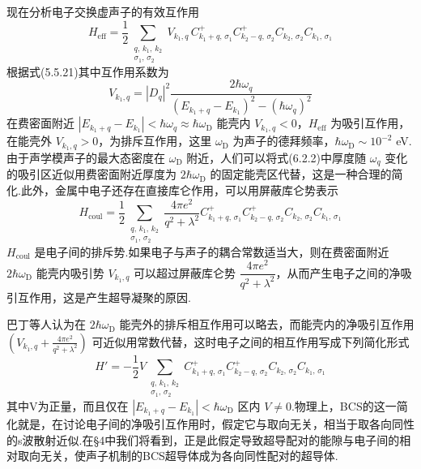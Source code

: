 现在分析电子交换虚声子的有效互作用
\begin{equation}
  H_{\mathrm{eff}}=\frac{1}{2}\sum_{\substack{q,\,k_{1},\,k_{2}\\\sigma_{1},\,\sigma_{2}}}
  V_{k_{1},q}\,C^{+}_{k_{1}+q,\,\sigma_{1}}C^{+}_{k_{2}-q,\,\sigma_{2}}
  C_{k_{2},\,\sigma_{2}}C_{k_{1},\,\sigma_{1}}
\end{equation}
根据式(5.5.21)其中互作用系数为
\begin{equation}
  V_{k_{1},q}=|D_{q}|^{2}
  \frac{2\hbar\omega_{q}}{(E_{k_{1}+q}-E_{k_{1}})^{2}-(\hbar\omega_{q})^{2}}
\end{equation}
在费密面附近 $|E_{k_{1}+q}-E_{k_{1}}|<\hbar\omega_{q}\approx\hbar\omega_{\mathrm{D}}$ 能壳内 $V_{k_{1},q}<0$，$H_{\mathrm{eff}}$ 为吸引互作用，在能壳外 $V_{k_{1},q}>0$，为排斥互作用，这里 $\omega_{\mathrm{D}}$ 为声子的德拜频率，$\hbar\omega_{\mathrm{D}}\sim10^{-2}$ eV.由于声学模声子的最大态密度在 $\omega_{\mathrm{D}}$ 附近，人们可以将式(6.2.2)中厚度随 $\omega_{q}$ 变化的吸引区近似用费密面附近厚度为 $2\hbar\omega_{\mathrm{D}}$ 的固定能壳区代替，这是一种合理的简化.此外，金属中电子还存在直接库仑作用，可以用屏蔽库仑势表示
\begin{equation}
  H_{\mathrm{coul}}=\frac{1}{2}\sum_{\substack{q,\,k_{1},\,k_{2}\\\sigma_{1},\,\sigma_{2}}}
  \frac{4\pi e^{2}}{q^{2}+\lambda^{2}}C^{+}_{k_{1}+q,\,\sigma_{1}}C^{+}_{k_{2}-q,\,\sigma_{2}}
  C_{k_{2},\,\sigma_{2}}C_{k_{1},\,\sigma_{1}}
\end{equation}
$H_{\mathrm{coul}}$ 是电子间的排斥势.如果电子与声子的耦合常数适当大，则在费密面附近 $2\hbar\omega_{\mathrm{D}}$ 能壳内吸引势 $V_{k_{1},q}$ 可以超过屏蔽库仑势 $\dfrac{4\pi e^{2}}{q^{2}+\lambda^{2}}$，从而产生电子之间的净吸引互作用，这是产生超导凝聚的原因.

巴丁等人认为在 $2\hbar\omega_{\mathrm{D}}$ 能壳外的排斥相互作用可以略去，而能壳内的净吸引互作用 $(V_{k_{1},q}+\frac{4\pi e^{2}}{q^{2}+\lambda^{2}})$ 可近似用常数代替，这时电子之间的相互作用写成下列简化形式
\begin{equation}
  H'=-\frac{1}{2}V\sum_{\substack{q,\,k_{1},\,k_{2}\\\sigma_{1},\,\sigma_{2}}}
  C^{+}_{k_{1}+q,\,\sigma_{1}}C^{+}_{k_{2}-q,\,\sigma_{2}}
  C_{k_{2},\,\sigma_{2}}C_{k_{1},\,\sigma_{1}}
\end{equation}
其中V为正量，而且仅在 $|E_{k_{1}+q}-E_{k_{1}}|<\hbar\omega_{\mathrm{D}}$ 区内 $V\neq0$.物理上，BCS的这一简化就是，在讨论电子间的净吸引互作用时，假定它与取向无关，相当于取各向同性的s波散射近似.在§4中我们将看到，正是此假定导致超导配对的能隙与电子间的相对取向无关，使声子机制的BCS超导体成为各向同性配对的超导体.

